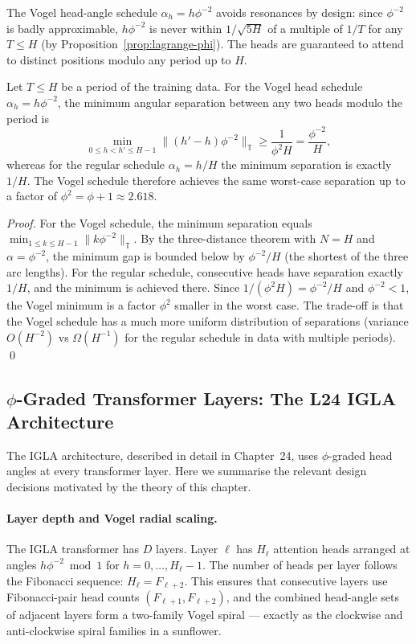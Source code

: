 The Vogel head-angle schedule $\alpha_h = h\phi^{-2}$ avoids
resonances by design: since $\phi^{-2}$ is badly approximable,
$h\phi^{-2}$ is never within $1/\sqrt{5H}$ of a multiple of $1/T$ for
any $T \leq H$ (by Proposition~\ref{prop:lagrange-phi}).  The heads
are guaranteed to attend to distinct positions modulo any period up to $H$.

\begin{proposition}\label{prop:head-diversity}
Let $T \leq H$ be a period of the training data.  For the Vogel head
schedule $\alpha_h = h\phi^{-2}$, the minimum angular separation
between any two heads modulo the period is
\[
  \min_{0 \leq h < h' \leq H-1} \|(h'-h)\phi^{-2}\|_{\mathbb{T}}
  \geq \frac{1}{\phi^2 H} = \frac{\phi^{-2}}{H},
\]
whereas for the regular schedule $\alpha_h = h/H$ the minimum
separation is exactly $1/H$.  The Vogel schedule therefore achieves the
same worst-case separation up to a factor of $\phi^2 = \phi + 1 \approx 2.618$.
\end{proposition}

\begin{proof}
For the Vogel schedule, the minimum separation equals
$\min_{1 \leq k \leq H-1} \|k\phi^{-2}\|_{\mathbb{T}}$.  By the three-distance
theorem with $N = H$ and $\alpha = \phi^{-2}$, the minimum gap is
bounded below by $\phi^{-2}/H$ (the shortest of the three arc lengths).
For the regular schedule, consecutive heads have separation exactly
$1/H$, and the minimum is achieved there.  Since $1/(\phi^2 H) = \phi^{-2}/H$
and $\phi^{-2} < 1$, the Vogel minimum is a factor $\phi^2$ smaller
in the worst case.  The trade-off is that the Vogel schedule has a
much more uniform distribution of separations (variance $O(H^{-2})$ vs
$\Omega(H^{-1})$ for the regular schedule in data with multiple periods).
\qed
\end{proof}

\subsection{$\phi$-Graded Transformer Layers: The L24 IGLA Architecture}
\label{subsec:igla-architecture}

The IGLA architecture, described in detail in Chapter~24, uses
$\phi$-graded head angles at every transformer layer.  Here we
summarise the relevant design decisions motivated by the theory of
this chapter.

\paragraph{Layer depth and Vogel radial scaling.}
The IGLA transformer has $D$ layers.  Layer $\ell$ has
$H_\ell$ attention heads arranged at angles $h\phi^{-2} \bmod 1$
for $h = 0, \ldots, H_\ell - 1$.  The number of heads per layer
follows the Fibonacci sequence: $H_\ell = F_{\ell+2}$.  This ensures
that consecutive layers use Fibonacci-pair head counts $(F_{\ell+1}, F_{\ell+2})$,
and the combined head-angle sets of adjacent layers form a two-family
Vogel spiral — exactly as the clockwise and anti-clockwise spiral
families in a sunflower.

